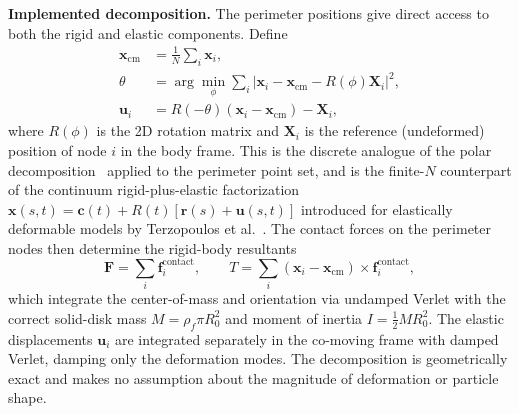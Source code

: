 \documentclass[aps,pre,twocolumn,floatfix,longbibliography]{revtex4-2}
\begin{document}
\textbf{Implemented decomposition.}
The perimeter positions give direct access to both the rigid and elastic
components.  Define
\begin{align}
  \mathbf{x}_\text{cm} &= \frac{1}{N}\sum_i \mathbf{x}_i,
  \label{eq:xcm}\\
  \theta &= \arg\!\min_\phi \sum_i |\mathbf{x}_i - \mathbf{x}_\text{cm}
    - R(\phi)\mathbf{X}_i|^2,
  \label{eq:theta}\\
  \mathbf{u}_i &= R(-\theta)(\mathbf{x}_i - \mathbf{x}_\text{cm}) - \mathbf{X}_i,
  \label{eq:ui}
\end{align}
where $R(\phi)$ is the 2D rotation matrix and $\mathbf{X}_i$ is the reference
(undeformed) position of node $i$ in the body frame.  This is the discrete
analogue of the polar decomposition~\cite{Gurtin1981} applied to the perimeter
point set, and is the finite-$N$ counterpart of the continuum
rigid-plus-elastic factorization $\mathbf{x}(s,t) = \mathbf{c}(t) +
R(t)[\mathbf{r}(s) + \mathbf{u}(s,t)]$ introduced for elastically
deformable models by Terzopoulos et al.~\cite{Terzopoulos1987}.
The contact forces on the perimeter nodes then determine the
rigid-body resultants
\begin{equation}
  \mathbf{F} = \sum_i \mathbf{f}_i^\text{contact},
  \qquad
  T = \sum_i (\mathbf{x}_i - \mathbf{x}_\text{cm}) \times
      \mathbf{f}_i^\text{contact},
\label{eq:FT}
\end{equation}
which integrate the center-of-mass and orientation via undamped Verlet with the
correct solid-disk mass $M = \rho_f \pi R_0^2$ and moment of inertia
$I = \tfrac{1}{2}MR_0^2$.  The elastic displacements $\mathbf{u}_i$ are
integrated separately in the co-moving frame with damped Verlet, damping only
the deformation modes.  The decomposition is geometrically exact and makes no
assumption about the magnitude of deformation or particle shape.
\end{document}
